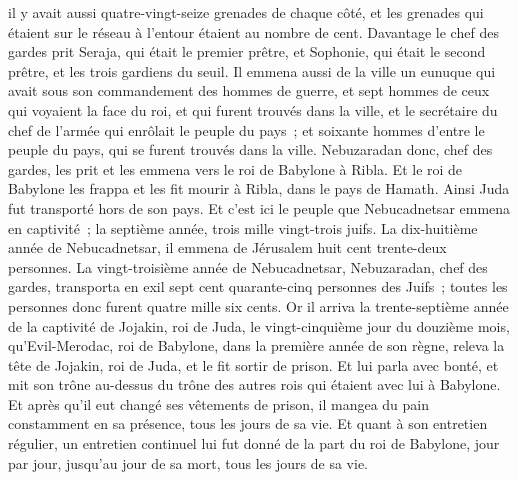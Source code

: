 \begin{multicols}{2}
il y avait aussi quatre-vingt-seize grenades de chaque côté, et les grenades qui étaient sur le réseau à l'entour étaient au nombre de cent.
Davantage le chef des gardes prit Seraja, qui était le premier prêtre, et Sophonie, qui était le second prêtre, et les trois gardiens du seuil.
Il emmena aussi de la ville un eunuque qui avait sous son commandement des hommes de guerre, et sept hommes de ceux qui voyaient la face du roi, et qui furent trouvés dans la ville, et le secrétaire du chef de l'armée qui enrôlait le peuple du pays~; et soixante hommes d'entre le peuple du pays, qui se furent trouvés dans la ville.
Nebuzaradan donc, chef des gardes, les prit et les emmena vers le roi de Babylone à Ribla.
Et le roi de Babylone les frappa et les fit mourir à Ribla, dans le pays de Hamath. Ainsi Juda fut transporté hors de son pays.
Et c'est ici le peuple que Nebucadnetsar emmena en captivité~; la septième année, trois mille vingt-trois juifs.
La dix-huitième année de Nebucadnetsar, il emmena de Jérusalem huit cent trente-deux personnes.
La vingt-troisième année de Nebucadnetsar, Nebuzaradan, chef des gardes, transporta en exil sept cent quarante-cinq personnes des Juifs~; toutes les personnes donc furent quatre mille six cents.
Or il arriva la trente-septième année de la captivité de Jojakin, roi de Juda, le vingt-cinquième jour du douzième mois, qu'Evil-Merodac, roi de Babylone, dans la première année de son règne, releva la tête de Jojakin, roi de Juda, et le fit sortir de prison.
Et lui parla avec bonté, et mit son trône au-dessus du trône des autres rois qui étaient avec lui à Babylone.
Et après qu'il eut changé ses vêtements de prison, il mangea du pain constamment en sa présence, tous les jours de sa vie.
Et quant à son entretien régulier, un entretien continuel lui fut donné de la part du roi de Babylone, jour par jour, jusqu'au jour de sa mort, tous les jours de sa vie.
\PPE{}
\end{multicols}
